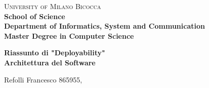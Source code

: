 \documentclass[a4paper,11pt,oneside, table]{article}
\begin{document}
  \noindent
  \begin{minipage}[t]{0.19\textwidth}
  \end{minipage}
  \begin{minipage}[t]{0.81\textwidth}
    {
      {\textsc{University of Milano Bicocca}} \\
      \textbf{School of Science} \\
      \textbf{Department of Informatics, System and Communication} \\
      \textbf{Master Degree in Computer Science} \\
      \par
    }
  \end{minipage}
  \begin{center}
    {\LARGE{
      \textbf{Riassunto di "Deployability"} \\
      \textbf{Architettura del Software}
      \par
    }}
  \end{center}
  \begin{center}
    \large{Refolli Francesco} \large{865955},
  \end{center}

  \renewcommand{\baselinestretch}{1.5}

  \printindex
\end{document}
